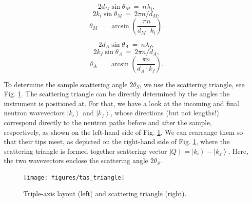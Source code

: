 \begin{minipage}{0.45\textwidth}
	\centering
	\begin{equation} 2 d_{M}\sin \theta_{M} \ =\  n \lambda_{i}, \end{equation}
	\begin{equation} 2 k_{i} \sin \theta_{M} \ =\  2 \pi n / d_{M}, \end{equation}
	\begin{equation} \boxed{ \theta_{M} \ =\  \arcsin \left( \frac{\pi n}{d_{M} \cdot k_{i}} \right). } \end{equation}
\end{minipage}
\begin{minipage}{0.45\textwidth}
	\centering
	\begin{equation} 2 d_{A}\sin \theta_{A} \ =\  n \lambda_{f}, \end{equation}
	\begin{equation} 2 k_{f} \sin \theta_{A} \ =\  2 \pi n / d_{A}, \end{equation}
	\begin{equation} \boxed{ \theta_{A} \ =\  \arcsin \left( \frac{\pi n}{d_{A} \cdot k_{f}} \right). } \end{equation}
\end{minipage}

\vspace{0.5cm}

To determine the sample scattering angle $2 \theta_S$, we use the scattering triangle, see Fig. \ref{fig:scattering_triangle}. 
The scattering triangle can be directly determined by the angles the instrument is positioned at. 
For that, we have a look at the incoming and final neutron wavevectors $\left| k_i \right>$ and $\left| k_f \right>$, whose directions (but not lengths!) correspond directly to the neutron paths before and after the sample, respectively, as shown on the left-hand side of Fig. \ref{fig:scattering_triangle}. We can rearrange them so that their tips meet, as depicted on the right-hand side of Fig. \ref{fig:scattering_triangle}, where the scattering triangle is formed together scattering vector $\left| Q \right> = \left| k_i \right> - \left| k_f \right>$. Here, the two wavevectors enclose the scattering angle $2 \theta_S$.

\begin{figure}
	\begin{center}
		\texttt{[image: figures/tas\_triangle]}
	\end{center}
	\caption[TAS layout and scattering triangle.]{
		Triple-axis layout (left) and scattering triangle (right). \label{fig:scattering_triangle}}
\end{figure}


